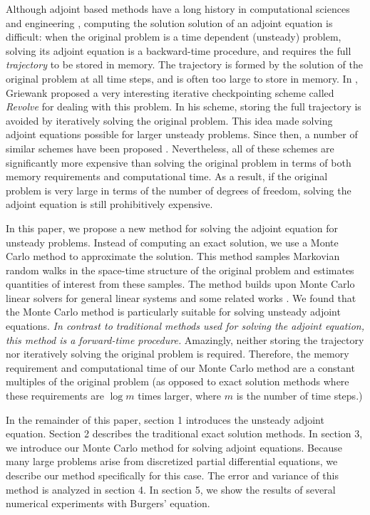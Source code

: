 \documentclass[a4paper,11pt]{article}
\theoremstyle{remark}
\theoremstyle{definition}
\begin{document}
    Although adjoint based methods have a long history in computational sciences
    and engineering \cite{Bryson1969}, computing the solution
    solution of an adjoint equation is difficult: when the original 
    problem is a time dependent (unsteady) problem, solving its adjoint
    equation is a backward-time procedure, and requires the full
    \emph{trajectory} to be stored in memory.  The trajectory is formed
    by the solution of the original problem at all time steps, and is 
    often too large to store in memory.  In \cite{Griewank1992}, Griewank
    proposed a very interesting iterative checkpointing scheme called
    \emph{Revolve} for dealing with this problem.  In his scheme, storing the
    full trajectory is
    avoided by iteratively solving the original problem.  This idea made 
    solving adjoint equations possible for larger unsteady problems.
    Since then, a number of similar schemes have been proposed
    \cite{Charpentier2001,Griewank2004}.  Nevertheless, all of these
    schemes are significantly more expensive than solving the original 
    problem in terms of both memory requirements and computational time.
    As a result, if the original problem is very large in terms of the number
    of degrees of freedom, solving the adjoint equation is still prohibitively
    expensive.
    
    In this paper, we propose a new method for solving the adjoint
    equation for unsteady problems.  Instead of computing an exact
    solution, we use a Monte Carlo method to approximate the solution.
    This method samples Markovian random walks in the space-time 
    structure of the original problem and estimates quantities of
    interest from these samples.  The method builds upon Monte Carlo
    linear solvers for general linear systems \cite{Forsythe1950,Dimov1998,
    Tan2002,Okten2005} and some related works \cite{Hanrahan2000}. 
    We found that the Monte Carlo method is particularly
    suitable for solving unsteady adjoint equations.  \emph{In contrast to
    traditional methods used for solving the adjoint equation, this method is
    a forward-time procedure.}  Amazingly, neither storing the trajectory 
    nor iteratively solving the original problem is required.  Therefore,
    the memory requirement and computational time of our Monte Carlo method
    are a constant multiples of the original problem (as opposed to exact
    solution methods where these requirements are $\log m$ times larger, where
    $m$ is the number of time steps.)
    
    In the remainder of this paper, section 1 introduces the unsteady adjoint
    equation.  Section 2 describes the traditional exact solution methods.  In
    section 3, we introduce our Monte Carlo method for solving adjoint
    equations.  Because many large problems arise from discretized partial
    differential equations, we describe our method specifically for this case.
    The error and variance of this method is analyzed in section 4.  In
    section 5, we show the results of several numerical experiments with
    Burgers' equation.
\end{document}
